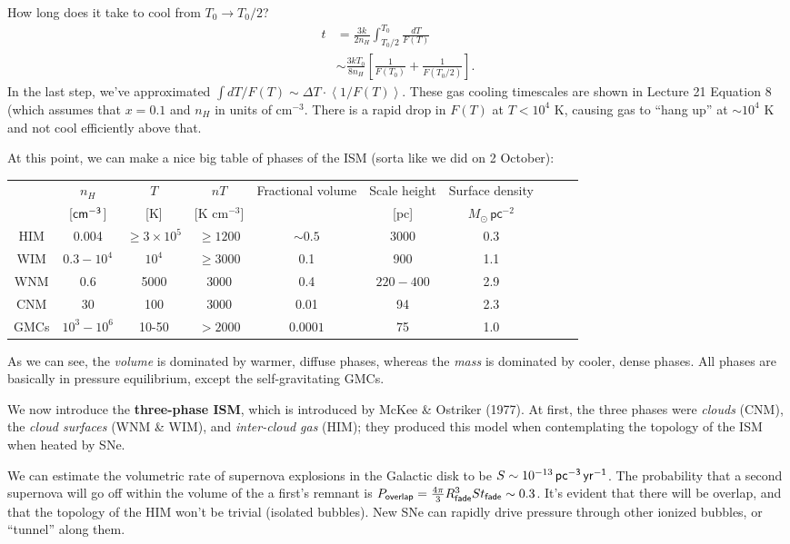 \documentclass{tufte-handout}
\renewcommand{\textbf}[1]{{\bf \textcolor{dark-gray}{#1}}}
\renewcommand{\rm}{\sf}
\renewcommand{\textrm}{\textsf}
\newcommand{\e}[1]{\times 10^{#1}}
\newcommand{\ev}[1]{\left\langle  {#1} \right \rangle} %
\begin{document}
How long does it take to cool from $T_0\rightarrow T_0/2$?
\begin{align*}
t &= \frac{3k}{2n_H}\int_{T_0/2}^{T_0}\frac{dT}{F(T)}\\
&\sim \frac{3kT_0}{8n_H}\left [\frac{1}{F(T_0)} + \frac{1}{F(T_0/2)}\right ].
\end{align*} 
In the last step, we've approximated $\int dT/F(T) \sim \Delta T \cdot \ev{1/F(T)}$. These gas cooling timescales are shown in Lecture 21 Equation 8 (which assumes that $x = 0.1$ and $n_H$ in units of cm$^{-3}$. There is a rapid drop in $F(T)$ at $T < 10^4$ K, causing gas to ``hang up'' at $\sim 10^4$ K and not cool efficiently above that.

At this point, we can make a nice big table of phases of the ISM (sorta like we did on 2 October):

\begin{tabular}{c|ccccccccc}
& $n_H$  & $T$ & $nT$ & Fractional volume & Scale height & Surface density \\
& [${\rm cm^{-3}}$] & [K] & [K cm$^{-3}$] & & [pc] & $M_\odot\,\textrm{pc}^{-2}$  \\
\hline
HIM & 0.004 & $\geq 3\e{5}$ & $\geq 1200$ & $\sim 0.5$ & 3000 & 0.3 \\
WIM & $0.3-10^4$ & $10^4$ & $\geq 3000$ & 0.1 & 900 & 1.1 \\
WNM & 0.6 & 5000 & 3000 & 0.4 & $220-400$ & 2.9\\
CNM & 30 & 100 & 3000 & 0.01 & 94 & 2.3\\
GMCs & $10^3-10^6$ & 10-50 & $> 2000$ & $0.0001$ & 75 & 1.0
\end{tabular}


\vspace{2em}

As we can see, the \textit{volume} is dominated by warmer, diffuse phases, whereas the \textit{mass} is dominated by cooler, dense phases. All phases are basically in pressure equilibrium, except the self-gravitating GMCs.

We now introduce the \textbf{three-phase ISM}, which is introduced by McKee \& Ostriker (1977).
At first, the three phases were \textit{clouds} (CNM), the \textit{cloud surfaces} (WNM \& WIM), and \textit{inter-cloud gas} (HIM); they produced this model when contemplating the topology of the ISM when heated by SNe.

We can estimate the volumetric rate of supernova explosions in the Galactic disk to be $S \sim 10^{-13} \,{\rm pc^{-3}\, yr^{-1}}$. The probability that a second supernova will go off within the volume of the a first's remnant is $P_{\rm overlap} = \frac{4\pi}{3}R_{\rm fade}^3 S t_{\rm fade}\sim 0.3$.\sidenote{We know that $t_{\rm fade} \sim 1.7\e{6}$ yr.} It's evident that there will be overlap, and that the topology of the HIM won't be trivial (isolated bubbles). New SNe can rapidly drive pressure through other ionized bubbles, or ``tunnel'' along them.
\end{document}
